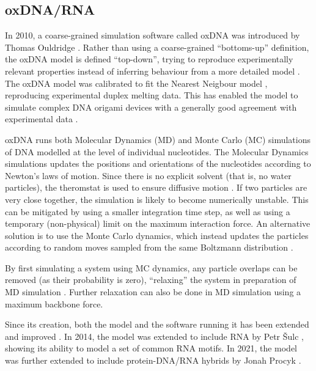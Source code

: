 \subsection{oxDNA/RNA}
\label{sec:oxDNA}

In 2010, a coarse-grained simulation software called oxDNA was introduced by Thomas Ouldridge \cite{ouldridge2010dna}. Rather than using a coarse-grained ``bottoms-up'' definition, the oxDNA model is defined ``top-down'', trying to reproduce experimentally relevant properties instead of inferring behaviour from a more detailed model \cite{sengar2021primer}. The oxDNA model was calibrated to fit the Nearest Neigbour model \cite{santalucia1998unified}, reproducing experimental duplex melting data. This has enabled the model to simulate complex DNA origami devices with a generally good agreement with experimental data \cite{sharma2017characterizing}.

oxDNA runs both Molecular Dynamics (MD) and Monte Carlo (MC) simulations of DNA modelled at the level of individual nucleotides. The Molecular Dynamics simulations updates the positions and orientations of the nucleotides according to Newton's laws of motion. Since there is no explicit solvent (that is, no water particles), the theromstat is used to ensure diffusive motion \cite{sengar2021primer}. If two particles are very close together, the simulation is likely to become numerically unstable. This can be mitigated by using a smaller integration time step, as well as using a temporary (non-physical) limit on the maximum interaction force. An alternative solution is to use the Monte Carlo dynamics, which instead updates the particles according to random moves sampled from the same Boltzmann distribution \cite{sengar2021primer}.

By first simulating a system using MC dynamics, any particle overlaps can be removed (as their probability is zero), ``relaxing'' the system in preparation of MD simulation \cite{doye2020oxdna}. Further relaxation can also be done in MD simulation using a maximum backbone force. 

Since its creation, both the model and the software running it has been extended and improved \cite{ouldridge2011structural, rovigatti2015comparison, sulc2012Sequence, ouldridge2013optimizing, snodin2015introducing}. In 2014, the model was extended to include RNA by Petr {\v{S}}ulc \cite{vsulc2014nucleotide}, showing its ability to model a set of common RNA motifs. In 2021, the model was further extended to include protein-DNA/RNA hybrids by Jonah Procyk \cite{procyk2021coarse}.


